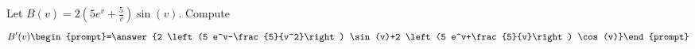 \documentclass{ximera}
\author{Bart Snapp}
\begin{document}
\begin{exercise}
Let $B(v) = 2 \left(5 e^v+\frac{5}{v}\right) \sin (v)$. Compute
\[
B'(v)
\begin{prompt}=\answer{2 \left(5 e^v-\frac{5}{v^2}\right) \sin (v)+2 \left(5 e^v+\frac{5}{v}\right) \cos (v)}\end{prompt}
\]
\end{exercise}
\end{document}
